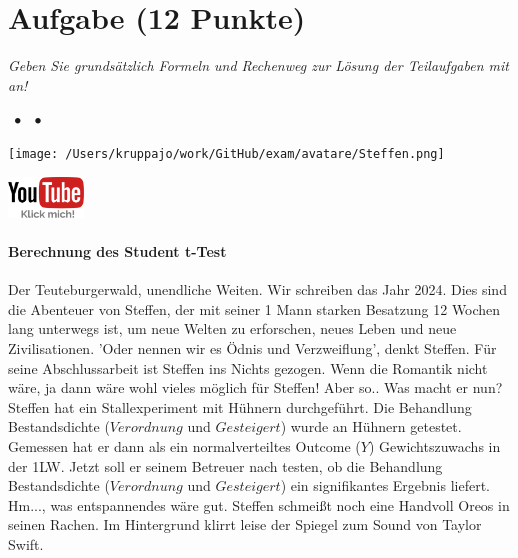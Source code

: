 \documentclass[a4paper, 9pt]{scrartcl}\usepackage[]{graphicx}\usepackage[]{xcolor}
\begin{document}
\section{Aufgabe \hfill (12 Punkte)}

\textit{Geben Sie grundsätzlich Formeln und Rechenweg zur Lösung der Teilaufgaben mit an!} \\[1Ex]
 

 
\ifcollection
\begin{flushright}
\tiny\vspace{-3Ex}
\textbf{\examinhaltstart}
\exammodulemathstat $\;\bullet$
\exammodulestat $\;\bullet$
\exammodulestatbbv 
\vspace{-4Ex}
\end{flushright}
\begin{minipage}[t]{0.5\textwidth}
\texttt{[image: /Users/kruppajo/work/GitHub/exam/avatare/Steffen.png]}
\end{minipage}
\begin{minipage}[t]{0.5\textwidth}
\hfill
\href{https://youtu.be/Cq_rF_z4xOk}{\includegraphics[width = 2cm]{img/youtube}}
\end{minipage}
\vspace{-3ex}
\fi



\ifcollection
\paragraph{Berechnung des Student t-Test}
\fi

Der Teuteburgerwald, unendliche Weiten. Wir schreiben das Jahr 2024. Dies sind die Abenteuer von Steffen, der mit seiner 1 Mann starken Besatzung 12 Wochen lang unterwegs ist, um neue Welten zu erforschen, neues Leben und neue Zivilisationen. 'Oder nennen wir es Ödnis und Verzweiflung', denkt Steffen. Für seine Abschlussarbeit ist Steffen ins Nichts gezogen. Wenn die Romantik nicht wäre, ja dann wäre wohl vieles möglich für Steffen! Aber so.. Was macht er nun? Steffen hat ein Stallexperiment mit Hühnern durchgeführt. Die Behandlung Bestandsdichte ($Verordnung$ und $Gesteigert$) wurde an Hühnern getestet. Gemessen hat er dann als ein normalverteiltes Outcome ($Y$) Gewichtszuwachs in der 1LW. Jetzt soll er seinem Betreuer nach testen, ob die Behandlung Bestandsdichte ($Verordnung$ und $Gesteigert$) ein signifikantes Ergebnis liefert. Hm..., was entspannendes wäre gut. Steffen schmeißt noch eine Handvoll Oreos in seinen Rachen. Im Hintergrund klirrt leise der Spiegel zum Sound von Taylor Swift.
\end{document}
